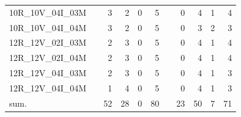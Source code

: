 \begin{tabular}{llrrrrlrrrr}
10R\_10V\_04I\_03M & \hspace{0.1cm} & 3 & 2 & 0 & 5 & \hspace{0.2cm} & 0 & 4 & 1 & 4\\
10R\_10V\_04I\_04M & \hspace{0.1cm} & 3 & 2 & 0 & 5 & \hspace{0.2cm} & 0 & 3 & 2 & 3\\
\addlinespace
12R\_12V\_02I\_03M & \hspace{0.1cm} & 2 & 3 & 0 & 5 & \hspace{0.2cm} & 0 & 4 & 1 & 4\\
12R\_12V\_02I\_04M & \hspace{0.1cm} & 2 & 3 & 0 & 5 & \hspace{0.2cm} & 0 & 4 & 1 & 4\\
12R\_12V\_04I\_03M & \hspace{0.1cm} & 2 & 3 & 0 & 5 & \hspace{0.2cm} & 0 & 4 & 1 & 3\\
12R\_12V\_04I\_04M & \hspace{0.1cm} & 1 & 4 & 0 & 5 & \hspace{0.2cm} & 0 & 4 & 1 & 3\\
\addlinespace
sum. & \hspace{0.1cm} & 52 & 28 & 0 & 80 & \hspace{0.2cm} & 23 & 50 & 7 & 71\\
\bottomrule
\end{tabular}
